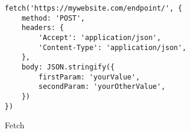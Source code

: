 \begin{listing}[H]
    \begin{verbatim}
fetch('https://mywebsite.com/endpoint/', {
    method: 'POST',
    headers: {
        'Accept': 'application/json',
        'Content-Type': 'application/json',
    },
    body: JSON.stringify({
        firstParam: 'yourValue',
        secondParam: 'yourOtherValue',
    })
})
    \end{verbatim}
    \caption{Fetch \cite{facebook_inc._fetch_2017}}
    \label{lst:fetch}
\end{listing}

